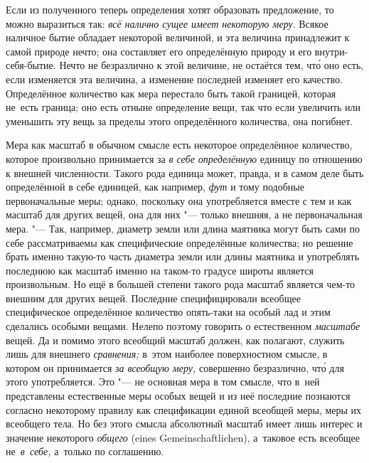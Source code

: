 Если из полученного теперь определения хотят образовать предложение, то можно
выразиться так: {\em всё налично сущее имеет некоторую меру}. Всякое наличное
бытие обладает некоторой величиной, и эта величина принадлежит к самой природе
нечто; она составляет его определённую природу и его внутри-себя-бытие. Нечто
не безразлично к этой величине, не остаётся тем, чт\'{о} оно есть, если
изменяется эта величина, а изменение последней изменяет его качество.
Определённое количество как мера перестало быть такой границей, которая не~есть
граница; оно есть отныне определение вещи, так что если увеличить или уменьшить
эту вещь за пределы этого определённого количества, она погибнет.

Мера как масштаб в обычном смысле есть некоторое определённое количество,
которое произвольно принимается за {\em в себе определённую} единицу по
отношению к внешней численности. Такого рода единица может, правда, и в самом
деле быть определённой в себе единицей, как например,
{\em фут} и тому подобные первоначальные
меры; однако, поскольку она употребляется вместе с тем и как масштаб для других
вещей, она для них "--- только внешняя, а не первоначальная мера. "--- Так,
например, диаметр земли или длина маятника могут быть сами по себе
рассматриваемы как специфические определённые количества; но решение брать
именно такую-то часть диаметра земли или длины маятника и употреблять последнюю
как масштаб именно на таком-то градусе широты является произвольным. Но ещё в
большей степени такого рода масштаб является чем-то внешним для других вещей.
Последние специфицировали всеобщее специфическое определённое количество
опять-таки на особый лад и этим сделались особыми вещами. Нелепо поэтому
говорить о естественном {\em масштабе} вещей. Да и помимо этого всеобщий
масштаб должен, как полагают, служить лишь для внешнего {\em сравнения;} в~этом
наиболее поверхностном смысле, в котором он принимается {\em за всеобщую меру,}
совершенно безразлично, чт\'{о} для этого употребляется. Это "--- не основная
мера в том смысле, что в~ней представлены естественные меры особых вещей и из
неё последние познаются согласно некоторому правилу как спецификации единой
всеобщей меры, меры их всеобщего тела. Но без этого смысла абсолютный масштаб
имеет лишь интерес и значение некоторого {\em общего}
(eines Gemein\-schaft\-li\-chen), а~таковое есть всеобщее
не~{\em в~себе,} а~только по соглашению.

